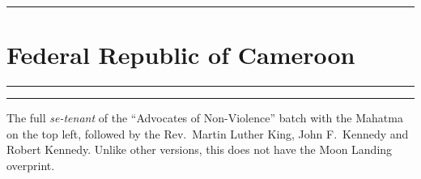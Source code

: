 \documentclass[a4paper]{article}
\begin{document}
  \hrule
\section*{Federal Republic of Cameroon}
\vspace{8pt}
\hrule
\vspace{18cm}
\begin{center}
\begin{minipage}{10cm}
  \hrule \vspace{12pt} The full {\it se-tenant} of the ``Advocates of
  Non-Violence'' batch with the Mahatma on the top left, followed by
  the Rev.\ Martin Luther King, John F.\ Kennedy and Robert
  Kennedy. Unlike other versions, this does not have the Moon Landing
  overprint.
\end{minipage}
\end{center}

\end{document}
